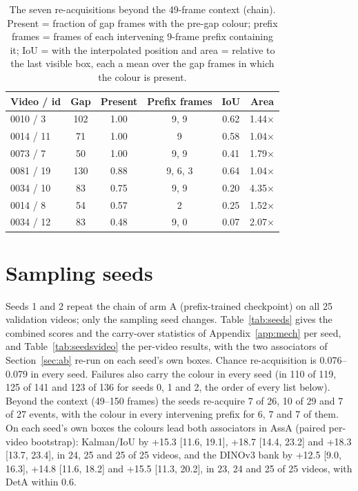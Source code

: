 \documentclass{article} %
\newcommand{\rev}[1]{#1}
\begin{document}
\begin{table}[h]
\caption{\rev{The seven re-acquisitions beyond the 49-frame context (chain). Present =
fraction of gap frames with the pre-gap colour; prefix frames = frames of each intervening
9-frame prefix containing it; IoU = with the interpolated position and area = relative to
the last visible box, each a mean over the gap frames in which the colour is present.}}
\label{tab:beyond}
\begin{center}
\scriptsize
\begin{tabular}{lccccc}
\toprule
\rev{Video / id} & \rev{Gap} & \rev{Present} & \rev{Prefix frames} & \rev{IoU} & \rev{Area} \\
\midrule
\rev{0010 / 3} & \rev{102} & \rev{1.00} & \rev{9, 9} & \rev{0.62} & \rev{1.44$\times$} \\
\rev{0014 / 11} & \rev{71} & \rev{1.00} & \rev{9} & \rev{0.58} & \rev{1.04$\times$} \\
\rev{0073 / 7} & \rev{50} & \rev{1.00} & \rev{9, 9} & \rev{0.41} & \rev{1.79$\times$} \\
\rev{0081 / 19} & \rev{130} & \rev{0.88} & \rev{9, 6, 3} & \rev{0.64} & \rev{1.04$\times$} \\
\rev{0034 / 10} & \rev{83} & \rev{0.75} & \rev{9, 9} & \rev{0.20} & \rev{4.35$\times$} \\
\rev{0014 / 8} & \rev{54} & \rev{0.57} & \rev{2} & \rev{0.25} & \rev{1.52$\times$} \\
\rev{0034 / 12} & \rev{83} & \rev{0.48} & \rev{9, 0} & \rev{0.07} & \rev{2.07$\times$} \\
\bottomrule
\end{tabular}
\end{center}
\end{table}

\rev{\section{Sampling seeds}
\label{app:seeds}
Seeds 1 and 2 repeat the chain of arm A (prefix-trained checkpoint) on all 25 validation
videos; only the sampling seed changes. Table~\ref{tab:seeds} gives the combined scores and
the carry-over statistics of Appendix~\ref{app:mech} per seed, and Table~\ref{tab:seedsvideo}
the per-video results, with the two associators of Section~\ref{sec:ab} re-run on each
seed's own boxes. Chance re-acquisition is 0.076--0.079 in every seed. Failures also carry
the colour in every seed (in 110 of 119, 125 of 141 and 123 of 136 for seeds 0, 1 and 2, the
order of every list below). Beyond the context
(49--150 frames) the seeds re-acquire 7 of 26, 10 of 29 and 7 of 27 events, with the colour in every intervening
prefix for 6, 7 and 7 of them. On each seed's own boxes the colours lead both associators in
AssA (paired per-video bootstrap): Kalman/IoU by +15.3 [11.6, 19.1], +18.7 [14.4, 23.2] and
+18.3 [13.7, 23.4], in 24, 25 and 25 of 25 videos, and the DINOv3 bank by +12.5 [9.0, 16.3],
+14.8 [11.6, 18.2] and +15.5 [11.3, 20.2], in 23, 24 and 25 of 25 videos, with DetA within 0.6.}
\end{document}
